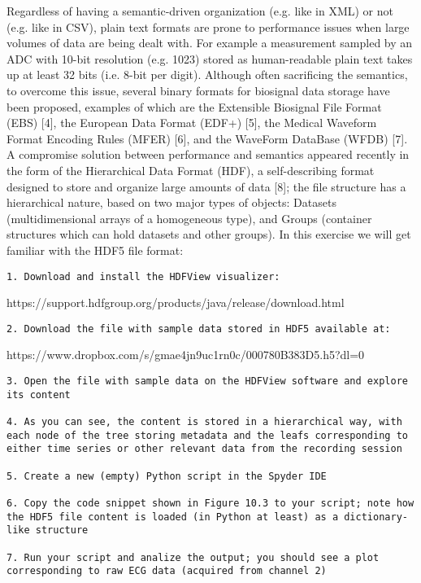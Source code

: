 \documentclass[11pt]{article}
\begin{document}
Regardless of having a semantic-driven organization (e.g. like in XML)
or not (e.g. like in CSV), plain text formats are prone to performance
issues when large volumes of data are being dealt with. For example a
measurement sampled by an ADC with 10-bit resolution (e.g. 1023) stored
as human-readable plain text takes up at least 32 bits (i.e. 8-bit per
digit). Although often sacrificing the semantics, to overcome this
issue, several binary formats for biosignal data storage have been
proposed, examples of which are the Extensible Biosignal File Format
(EBS) {[}4{]}, the European Data Format (EDF+) {[}5{]}, the Medical
Waveform Format Encoding Rules (MFER) {[}6{]}, and the WaveForm DataBase
(WFDB) {[}7{]}. A compromise solution between performance and semantics
appeared recently in the form of the Hierarchical Data Format (HDF), a
self-describing format designed to store and organize large amounts of
data {[}8{]}; the file structure has a hierarchical nature, based on two
major types of objects: Datasets (multidimensional arrays of a
homogeneous type), and Groups (container structures which can hold
datasets and other groups). In this exercise we will get familiar with
the HDF5 file format:

\begin{verbatim}
1. Download and install the HDFView visualizer:
\end{verbatim}

https://support.hdfgroup.org/products/java/release/download.html

\begin{verbatim}
2. Download the file with sample data stored in HDF5 available at:
\end{verbatim}

https://www.dropbox.com/s/gmae4jn9uc1rn0c/000780B383D5.h5?dl=0

\begin{verbatim}
3. Open the file with sample data on the HDFView software and explore its content

4. As you can see, the content is stored in a hierarchical way, with each node of the tree storing metadata and the leafs corresponding to either time series or other relevant data from the recording session

5. Create a new (empty) Python script in the Spyder IDE

6. Copy the code snippet shown in Figure 10.3 to your script; note how the HDF5 file content is loaded (in Python at least) as a dictionary-like structure

7. Run your script and analize the output; you should see a plot corresponding to raw ECG data (acquired from channel 2)
\end{verbatim}
\end{document}
